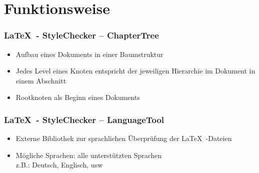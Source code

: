 \section{Funktionsweise}
\begin{frame}
\frametitle{\LaTeX~- StyleChecker -- ChapterTree}
\begin{block}{\vspace*{-3ex}}
	\begin{itemize}
		\item Aufbau eines Dokuments in einer Baumstruktur
		\item Jedes Level eines Knoten entspricht der jeweiligen Hierarchie im Dokument in einem Abschnitt
		\item Rootknoten als Beginn eines Dokuments
	\end{itemize}
\end{block}
\end{frame}
\begin{frame}
\frametitle{\LaTeX~- StyleChecker -- LanguageTool}
\begin{block}{\vspace*{-3ex}}
	\begin{itemize}
		\item Externe Bibliothek zur sprachlichen Überprüfung der \LaTeX~-Dateien
		\item Mögliche Sprachen: alle unterstützten Sprachen \\ z.B.: Deutsch, Englisch, usw
	\end{itemize}
\end{block}
\end{frame}